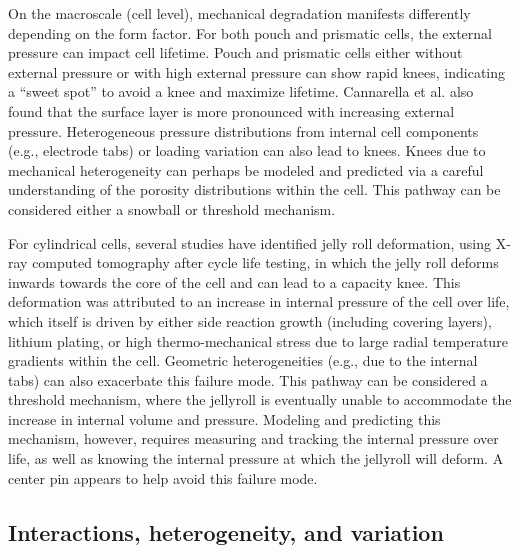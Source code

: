 \documentclass[journal=jpclcd,manuscript=article]{achemso}
\begin{document}
On the macroscale (cell level), mechanical degradation manifests differently depending on the form factor. For both pouch and prismatic cells, the external pressure can impact cell lifetime. Pouch and prismatic cells either without external pressure\cite{wunsch_investigation_2019} or with high external pressure\cite{cannarella_stress_2014} can show rapid knees, indicating a ``sweet spot'' to avoid a knee and maximize lifetime. Cannarella et al.\cite{cannarella_stress_2014} also found that the surface layer is more pronounced with increasing external pressure. Heterogeneous pressure distributions from internal cell components (e.g., electrode tabs) or loading variation\cite{beck_inhomogeneities_2021} can also lead to knees. Knees due to mechanical heterogeneity can perhaps be modeled and predicted via a careful understanding of the porosity distributions within the cell. This pathway can be considered either a snowball or threshold mechanism.

For cylindrical cells, several studies\cite{waldmann_mechanical_2014, pfrang_long-term_2018, pfrang_geometrical_2019, carter_mechanical_2019, kok_virtual_2019} have identified jelly roll deformation, using X-ray computed tomography after cycle life testing, in which the jelly roll deforms inwards towards the core of the cell and can lead to a capacity knee. This deformation was attributed to an increase in internal pressure of the cell over life, which itself is driven by either side reaction growth (including covering layers)\cite{willenberg_development_2020}, lithium plating\cite{carter_mechanical_2019}, or high thermo-mechanical stress due to large radial temperature gradients within the cell\cite{waldmann_mechanical_2014}. Geometric heterogeneities (e.g., due to the internal tabs) can also exacerbate this failure mode.\cite{pfrang_long-term_2018, pfrang_geometrical_2019}
This pathway can be considered a threshold mechanism, where the jellyroll is eventually unable to accommodate the increase in internal volume and pressure. Modeling and predicting this mechanism, however, requires measuring and tracking the internal pressure over life, as well as knowing the internal pressure at which the jellyroll will deform. A center pin appears to help avoid this failure mode.\cite{waldmann_mechanical_2014, carter_mechanical_2019}

\subsection{Interactions, heterogeneity, and variation}
\end{document}
